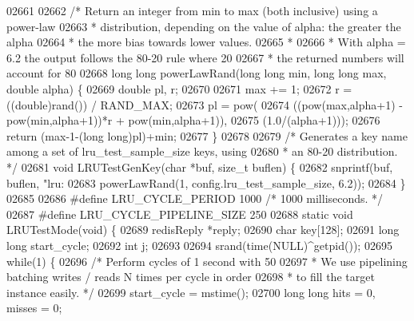 \begin{DoxyCode}
{{{{{{{{{{{{{{{{{{{{{{{{{{{{{{{{{{{{{{{{{{{{{{{{{{{{{{{{{{{{{{{{{{{{{{{{{{{{{{{{{{{{{{{{{{{{{{{{{{{{{{{{02661 
02662 \textcolor{comment}{/* Return an integer from min to max (both inclusive) using a power-law}
02663 \textcolor{comment}{ * distribution, depending on the value of alpha: the greater the alpha}
02664 \textcolor{comment}{ * the more bias towards lower values.}
02665 \textcolor{comment}{ *}
02666 \textcolor{comment}{ * With alpha = 6.2 the output follows the 80-20 rule where 20%
02667 \textcolor{comment}{ * the returned numbers will account for 80%
02668 \textcolor{keywordtype}{long} \textcolor{keywordtype}{long} powerLawRand(\textcolor{keywordtype}{long} \textcolor{keywordtype}{long} min, \textcolor{keywordtype}{long} \textcolor{keywordtype}{long} max, \textcolor{keywordtype}{double} alpha) \{
02669     \textcolor{keywordtype}{double} pl, r;
02670 
02671     max += 1;
02672     r = ((\textcolor{keywordtype}{double})rand()) / RAND\_MAX;
02673     pl = pow(
02674         ((pow(max,alpha+1) - pow(min,alpha+1))*r + pow(min,alpha+1)),
02675         (1.0/(alpha+1)));
02676     \textcolor{keywordflow}{return} (max-1-(\textcolor{keywordtype}{long} \textcolor{keywordtype}{long})pl)+min;
02677 \}
02678 
02679 \textcolor{comment}{/* Generates a key name among a set of lru\_test\_sample\_size keys, using}
02680 \textcolor{comment}{ * an 80-20 distribution. */}
02681 \textcolor{keywordtype}{void} LRUTestGenKey(\textcolor{keywordtype}{char} *buf, size\_t buflen) \{
02682     snprintf(buf, buflen, \textcolor{stringliteral}{"lru:%
02683         powerLawRand(1, config.lru\_test\_sample\_size, 6.2));
02684 \}
02685 
02686 \textcolor{preprocessor}{#}\textcolor{preprocessor}{define} \textcolor{preprocessor}{LRU\_CYCLE\_PERIOD} 1000 \textcolor{comment}{/* 1000 milliseconds. */}
02687 \textcolor{preprocessor}{#}\textcolor{preprocessor}{define} \textcolor{preprocessor}{LRU\_CYCLE\_PIPELINE\_SIZE} 250
02688 \textcolor{keyword}{static} \textcolor{keywordtype}{void} LRUTestMode(\textcolor{keywordtype}{void}) \{
02689     redisReply *reply;
02690     \textcolor{keywordtype}{char} key[128];
02691     \textcolor{keywordtype}{long} \textcolor{keywordtype}{long} start\_cycle;
02692     \textcolor{keywordtype}{int} j;
02693 
02694     srand(time(NULL)^getpid());
02695     \textcolor{keywordflow}{while}(1) \{
02696         \textcolor{comment}{/* Perform cycles of 1 second with 50%
02697 \textcolor{comment}{         * We use pipelining batching writes / reads N times per cycle in order}
02698 \textcolor{comment}{         * to fill the target instance easily. */}
02699         start\_cycle = mstime();
02700         \textcolor{keywordtype}{long} \textcolor{keywordtype}{long} hits = 0, misses = 0;
}}}}}}}}}}}}}}}}}}}}}}}}}}}}}}}}}}}}}}}}}}}}}}}}}}}}}}}}}}}}}}}}}}}}}}}}}}}}}}}}}}}}}}}}}}}}}}}}}}}}}}}}}}}}
\end{DoxyCode}
